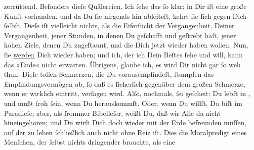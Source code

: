 \begin{ledgroupsized}[t]{13cm}
               zerrüttend. Beſonders dieſe Quälereien. Ich ſehe das ſo klar: in Dir iſt eine große
               Kunſt vorhanden, und da Du ſie nirgends hin ableiteſt, kehrt ſie ſich gegen Dich
               ſelbſt. Dieſe \label{K_L02649-2v}\label{K_L02649-2h}
               iſt vielleicht nichts, als die Eiferſucht \uline{der}
               Vergangenheit, \uline{Deiner} Vergangenheit, jener Stunden,
               in denen Du geſchafft und geſtrebt haſt, jener hohen Ziele, denen Du zugeſtaunt, und
               die Dich jetzt wieder haben wollen. Nun, ſie \uline{werden}
               Dich wieder haben; und ich, der ich Dein Beſtes ſehe und will, kann das »Ende« nicht
               erwarten. Übrigens, glaube ich, es wird Dir nicht gar ſo weh thun. Dieſe tollen
               Schmerzen, die Du vorausempfindeſt, {\pb}ſtumpfen das
               Empfindungsvermögen ab, ſo daß es ſicherlich gegenüber dem großen Schmerze, wenn er
               wirklich eintritt, verſagen wird. Alſo, nochmals, ſei geſcheit: Du lebſt in \label{K_L02649-3v}\label{K_L02649-3h},
               und mußt ſroh ſein, wenn Du herauskommſt. Oder, wenn Du willſt, Du biſt im Paradieſe;
               aber, als ſrommer Bibelleſer,  weißt Du, daß wir Alle da nicht hineingehören; und Du wirſt Dich doch wieder
               mit der Erde befreunden müſſen, auf der zu leben ſchließlich auch nicht ohne Reiz
               iſt.\pend
           \pstart
           Dies die Moralpredigt eines Menſchen, der ſelbst nichts dringender brauchte, als eine

\end{ledgroupsized}
